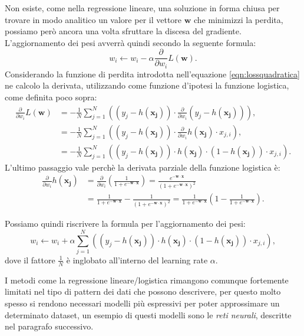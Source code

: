 \documentclass[../../main.tex]{subfiles}
\begin{document}
    Non esiste, come nella regressione lineare, una soluzione in forma chiusa per trovare in modo analitico un valore per il vettore $\boldsymbol{w}$ che minimizzi la perdita, possiamo però ancora una volta sfruttare la discesa del gradiente. L'aggiornamento dei pesi avverrà quindi secondo la seguente formula:
    \[w_i \leftarrow w_i - \alpha \frac{\partial}{\partial w_i} L(\boldsymbol{w}).\]
    Considerando la funzione di perdita introdotta nell'equazione \ref{eqn:lossquadratica} ne calcolo la derivata, utilizzando come funzione d'ipotesi la funzione logistica, come definita poco sopra:
    \begin{align*}
        \frac{\partial}{\partial w_i} L(\boldsymbol{w}) &= -\frac{1}{N} \sum_{j=1}^N \left((y_j - h(\boldsymbol{x_j})) \cdot \frac{\partial}{\partial w_i} (y_j - h(\boldsymbol{x_j})) \right),\\
        &= -\frac{1}{N} \sum_{j=1}^N \left((y_j - h(\boldsymbol{x_j})) \cdot \frac{\partial}{\partial w_i} h(\boldsymbol{x_j}) \cdot x_{j,i} \right),\\
        &= -\frac{1}{N} \sum_{j=1}^N \left((y_j - h(\boldsymbol{x_j})) \cdot h(\boldsymbol{x_j}) \cdot (1 - h(\boldsymbol{x_j})) \cdot x_{j,i} \right).
    \end{align*}
    L'ultimo passaggio vale perchè la derivata parziale della funzione logistica è:
    \begin{align*}
        \frac{\partial}{\partial w_i} h(\boldsymbol{x_j}) &= \frac{\partial}{\partial w_i} \left(\frac{1}{1 + e^{-\boldsymbol{w}\cdot\boldsymbol{x}}}\right) = \frac{e^{-\boldsymbol{w}\cdot \boldsymbol{x}}}{\left(1 + e^{-\boldsymbol{w}\cdot \boldsymbol{x}}\right)^2}\\
        &= \frac{1}{1 + e^{-\boldsymbol{w}\cdot\boldsymbol{x}}} - \frac{1}{\left(1 + e^{-\boldsymbol{w}\cdot\boldsymbol{x}}\right)^2} = \frac{1}{1 + e^{-\boldsymbol{w}\cdot\boldsymbol{x}}}\left(1 - \frac{1}{1 + e^{-\boldsymbol{w}\cdot\boldsymbol{x}}}\right).
    \end{align*}

    Possiamo quindi riscrivere la formula per l'aggiornamento dei pesi:
    \begin{equation}
        w_i \leftarrow w_i + \alpha \sum_{j=1}^N \left((y_j - h(\boldsymbol{x_j})) \cdot h(\boldsymbol{x_j}) \cdot (1 - h(\boldsymbol{x_j})) \cdot x_{j,i} \right),
    \end{equation}
    dove il fattore $\frac{1}{N}$ è inglobato all'interno del learning rate $\alpha$.

    I metodi come la regressione lineare/logistica rimangono comunque fortemente limitati nel tipo di pattern dei dati che possono descrivere, per questo molto spesso si rendono necessari modelli più espressivi per  poter approssimare un determinato dataset, un esempio di questi modelli sono le \textit{reti neurali}, descritte nel paragrafo successivo.
\end{document}
